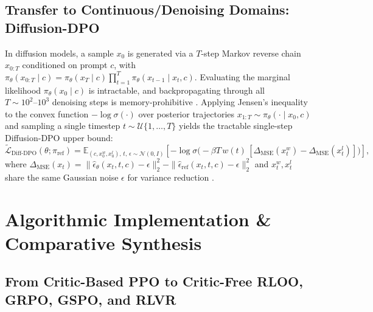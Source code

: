 \documentclass[../../../../master.tex]{subfiles}
\begin{document}
\subsection{Transfer to Continuous/Denoising Domains: Diffusion-DPO}

In diffusion models, a sample $x_0$ is generated via a $T$-step Markov reverse chain $x_{0:T}$ conditioned on prompt $c$, with $\pi_\theta(x_{0:T} \mid c) = \pi_\theta(x_T \mid c)\prod_{t=1}^T \pi_\theta(x_{t-1} \mid x_t, c)$. Evaluating the marginal likelihood $\pi_\theta(x_0 \mid c)$ is intractable, and backpropagating through all $T \sim 10^2\text{--}10^3$ denoising steps is memory-prohibitive . Applying Jensen's inequality to the convex function $-\log \sigma(\cdot)$ over posterior trajectories $x_{1:T} \sim \pi_\theta(\cdot \mid x_0, c)$ and sampling a single timestep $t \sim \mathcal{U}\{1,\dots,T\}$ yields the tractable single-step Diffusion-DPO upper bound:
\begin{equation}
\label{eq:align:diff_dpo}
\tilde{\mathcal{L}}_{\mathrm{Diff\text{-}DPO}}(\theta; \pi_{\mathrm{ref}}) = \mathbb{E}_{(c, x_0^w, x_0^l),\, t,\, \epsilon \sim \mathcal{N}(0,I)} \!\left[ -\log \sigma\!\big(-\beta T \, w(t) \, [\Delta_{\mathrm{MSE}}(x_t^w) - \Delta_{\mathrm{MSE}}(x_t^l)]\big) \right],
\end{equation}
where $\Delta_{\mathrm{MSE}}(x_t) = \|\hat{\epsilon}_\theta(x_t, t, c) - \epsilon\|_2^2 - \|\hat{\epsilon}_{\mathrm{ref}}(x_t, t, c) - \epsilon\|_2^2$ and $x_t^w, x_t^l$ share the same Gaussian noise $\epsilon$ for variance reduction .

\section{Algorithmic Implementation \& Comparative Synthesis}
\label{sec:align:algorithms}

\subsection{From Critic-Based PPO to Critic-Free RLOO, GRPO, GSPO, and RLVR}
\end{document}
